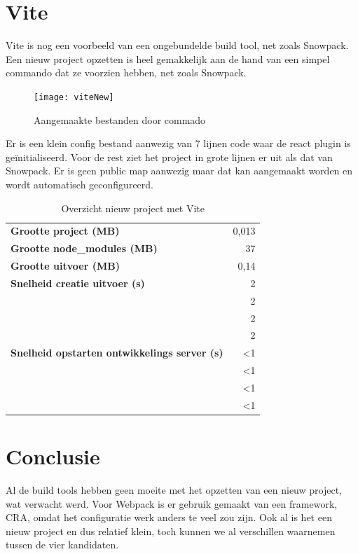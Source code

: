 \section{Vite}
Vite is nog een voorbeeld van een ongebundelde build tool, net zoals Snowpack. Een nieuw project opzetten is heel gemakkelijk aan de hand van een simpel commando dat ze voorzien hebben, net zoals Snowpack.



\begin{figure}[h]
   \texttt{[image: viteNew]}
       \centering
       \caption[Aangemaakte bestanden door Vite commando]{Aangemaakte bestanden door commado}
   \end{figure}

Er is een klein config bestand aanwezig van 7 lijnen code waar de react plugin is geïnitialiseerd. Voor de rest ziet het project in grote lijnen er uit als dat van Snowpack. Er is geen public map aanwezig maar dat kan aangemaakt worden en wordt automatisch geconfigureerd.

\begin{table}[h]
   \centering
   \begin{tabular}{lr}
   \textbf{Grootte project (MB)} & 0,013 \\
   \textbf{Grootte node\_modules (MB)} & 37 \\
   \textbf{Grootte uitvoer (MB)} & 0,14 \\
   \textbf{Snelheid creatie uitvoer (s)} & 2 \\
   \textbf{} & 2 \\
   \textbf{} & 2 \\
   \textbf{} & 2 \\
   \textbf{Snelheid opstarten ontwikkelings server (s)} & <1 \\
   \textbf{} & <1 \\
   \textbf{} & <1 \\
   \textbf{} & <1
   \end{tabular}
   \caption{Overzicht nieuw project met Vite}
   \end{table}


\section{Conclusie}
Al de build tools hebben geen moeite met het opzetten van een nieuw project, wat verwacht werd. Voor Webpack is er gebruik gemaakt van een framework, CRA, omdat het configuratie werk anders te veel zou zijn. Ook al is het een nieuw project en dus relatief klein, toch kunnen we al verschillen waarnemen tussen de vier kandidaten.

